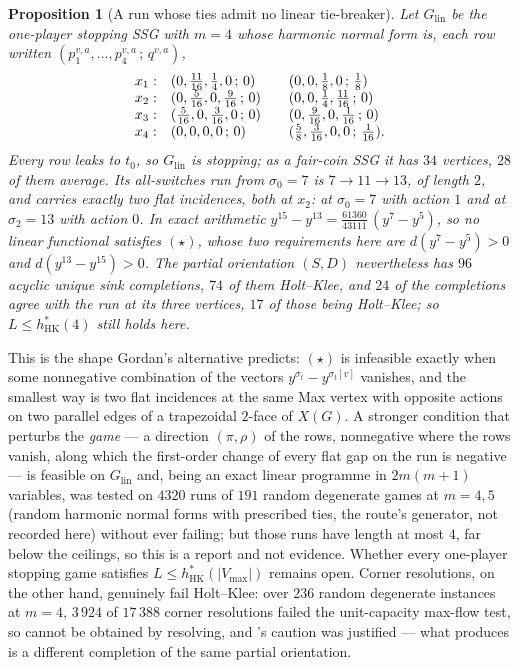 \documentclass[11pt]{article}
\theoremstyle{plain}
\newtheorem{proposition}[theorem]{Proposition}
\theoremstyle{definition}
\newcommand{\Vmax}{V_{\max}}
\begin{document}
\begin{proposition}[A run whose ties admit no linear tie-breaker]\label{prop:no-linear-tiebreak}
Let $G_{\mathrm{lin}}$ be the one-player stopping SSG with $m=4$ whose
harmonic normal form is, each row written
$(p^{v,a}_{1},\dots,p^{v,a}_{4}\,;\,q^{v,a})$,
\[
\begin{array}{r@{\quad}l@{\qquad}l}
 x_1: & (0,\tfrac{11}{16},\tfrac14,0\,;\,0) & (0,0,\tfrac18,0\,;\,\tfrac18)\\
 x_2: & (0,\tfrac5{16},0,\tfrac9{16}\,;\,0) & (0,0,\tfrac14,\tfrac{11}{16}\,;\,0)\\
 x_3: & (\tfrac5{16},0,\tfrac3{16},0\,;\,0) & (0,\tfrac9{16},0,\tfrac1{16}\,;\,0)\\
 x_4: & (0,0,0,0\,;\,0) & (\tfrac58,\tfrac3{16},0,0\,;\,\tfrac1{16}).
\end{array}
\]
Every row leaks to $t_0$, so $G_{\mathrm{lin}}$ is stopping; as a
fair-coin SSG it has $34$ vertices, $28$ of them average. Its all-switches
run from $\sigma_0=7$ is $7\to11\to13$, of length $2$, and carries
exactly two flat incidences, both at $x_2$: at $\sigma_0=7$ with action
$1$ and at $\sigma_2=13$ with action $0$. In exact arithmetic
$y^{15}-y^{13}=\tfrac{61360}{43111}\,(y^{7}-y^{5})$, so no linear
functional satisfies $(\star)$, whose two requirements here are
$d(y^{7}-y^{5})>0$ and $d(y^{13}-y^{15})>0$. The partial orientation
$(S,D)$ nevertheless has $96$ acyclic unique sink completions, $74$ of
them Holt--Klee, and $24$ of the completions agree with the run at its
three vertices, $17$ of those being Holt--Klee; so
$L\le h^{\ast}_{\mathrm{HK}}(4)$ still holds here.
\end{proposition}

This is the shape Gordan's alternative predicts: $(\star)$ is infeasible
exactly when some nonnegative combination of the vectors
$y^{\sigma_t}-y^{\sigma_t[v]}$ vanishes, and the smallest way is two flat
incidences at the same Max vertex with opposite actions on two parallel
edges of a trapezoidal $2$-face of $X(G)$. A stronger condition that
perturbs the \emph{game} --- a direction $(\pi,\rho)$ of the rows,
nonnegative where the rows vanish, along which the first-order change of
every flat gap on the run is negative --- is feasible on
$G_{\mathrm{lin}}$ and, being an exact linear programme in $2m(m+1)$
variables, was tested on $4320$ runs of $191$ random degenerate games at
$m=4,5$ (random harmonic normal forms with prescribed ties, the route's
generator, not recorded here) without ever failing; but those runs have length at most $4$,
far below the ceilings, so this is a report and not evidence. Whether
every one-player stopping game satisfies
$L\le h^{\ast}_{\mathrm{HK}}(|\Vmax|)$ remains open. Corner resolutions,
on the other hand, genuinely fail Holt--Klee: over $236$ random
degenerate instances at $m=4$, $3\,924$ of $17\,388$ corner resolutions
failed the unit-capacity max-flow test, so  cannot be
obtained by resolving, and 's caution was
justified --- what  produces is a different
completion of the same partial orientation.
\end{document}
